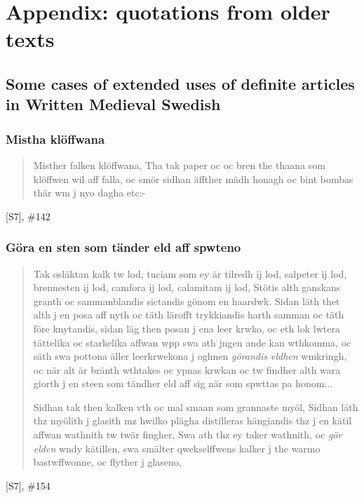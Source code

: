 
\chapter{Appendix: quotations from older texts}
\section{Some cases of extended uses of definite articles in Written Medieval Swedish}



 
\subsection*{Mistha klöffwana}
 
\begin{quotation}
Misther falken klöffwana, Tha tak paper oc  oc bren the thaana som klöffwen wil aff falla, oc smör sidhan äffther mädh honagh oc bint bombas thär wm j nyo dagha etc:-


\end{quotation}
[S7], \#142

\subsection*{Göra en sten som tänder eld aff spwteno} 
\begin{quotation}



Tak osläktan kalk tw lod, tuciam som ey är tilredh ij lod, salpeter ij lod, brennesten ij lod, camfora ij lod, calamitam ij lod, Stötis alth ganskans granth oc sammanblandis sictandis gönom en haardwk. Sidan läth thet alth j en posa aff nyth oc täth lärofft trykkiandis harth samman oc täth före knytandis, sidan läg then posan j ena leer krwko, oc eth lok lwtera tättelika oc starkelika affwan wpp swa ath jngen ande kan wthkomma, oc säth swa pottona äller leerkrwekona j oghnen \textit{görandis eldhen} wmkringh, oc när alt är bränth wthtakes oc ypnas krwkan oc tw findher alth wara giorth j en steen som tändher eld aff sig när som spwttas pa honom...


Sidhan tak then kalken vth oc mal smaan som grannaste myöl, Sidhan läth thz myölith j glasith mz hwilko plägha distilleras hängiandis thz j en kätil affwan wathnith tw twär fingher, Swa ath thz ey taker wathnith, oc \textit{gör elden} wndy kätillen, swa smälter qwekselffwens kalker j the warmo bastwffwonne, oc flyther j glaseno, 

\end{quotation}
[S7], \#154

